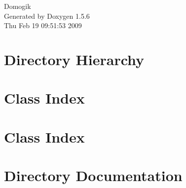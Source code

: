 \documentclass[a4paper]{book}
\begin{document}
\begin{titlepage}
\vspace*{7cm}
\begin{center}
{\Large Domogik }\\
\vspace*{1cm}
{\large Generated by Doxygen 1.5.6}\\
\vspace*{0.5cm}
{\small Thu Feb 19 09:51:53 2009}\\
\end{center}
\end{titlepage}
\clearemptydoublepage
{}
\tableofcontents
\clearemptydoublepage
{}
\chapter{Directory Hierarchy}

\chapter{Class Index}

\chapter{Class Index}

\chapter{Directory Documentation}




\end{document}
